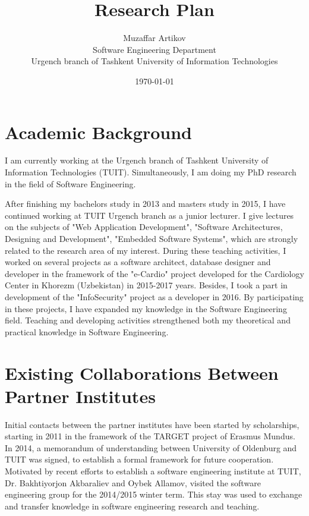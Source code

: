 \documentclass[10pt, oneside]{article}
\title{Research Plan}
\author{Muzaffar Artikov\\
Software Engineering Department\\
Urgench branch of Tashkent University of Information Technologies}
\date{\today}
\begin{document}
\maketitle

\section{Academic Background}
I am currently working at the Urgench branch of Tashkent University of Information Technologies (TUIT). Simultaneously, I am doing my PhD research in the field of Software Engineering. 

After finishing my bachelors study in 2013 and masters study in 2015, I have continued working at TUIT Urgench branch as a junior lecturer. I give lectures on the subjects of "Web Application Development", "Software Architectures, Designing and Development", "Embedded Software Systems", which are strongly related to the research area of my interest. During these teaching activities, I worked on several projects as a software architect, database designer and developer in the framework of the "e-Cardio" project developed for the Cardiology Center in Khorezm (Uzbekistan) in 2015-2017 years. Besides, I took a part in development of the "InfoSecurity" project as a developer in 2016. By participating in these projects, I have expanded my knowledge in the Software Engineering field. Teaching and developing activities strengthened both my theoretical and practical knowledge in Software Engineering.

\section{Existing Collaborations Between Partner Institutes}
Initial contacts between the partner institutes have been started by scholarships, starting in 2011 in the framework of the TARGET project of Erasmus Mundus. In 2014, a memorandum of understanding between University of Oldenburg and TUIT was signed, to establish a formal framework for future cooperation. Motivated by recent efforts to establish a software engineering institute at TUIT, Dr. Bakhtiyorjon Akbaraliev and Oybek Allamov, visited the software engineering group for the 2014/2015 winter term. This stay was used to exchange and transfer knowledge in software engineering research and teaching.
\end{document}
